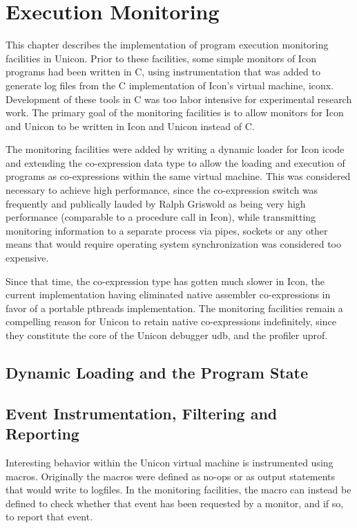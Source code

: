 \chapter{Execution Monitoring}

This chapter describes the implementation of program execution
monitoring facilities in Unicon. Prior to these facilities, some
simple monitors of Icon programs had been written in C, using
instrumentation that was added to generate log files from the C
implementation of Icon's virtual machine, iconx. Development of these
tools in C was too labor intensive for experimental research work. The
primary goal of the monitoring facilities is to allow monitors for
Icon and Unicon to be written in Icon and Unicon instead of C.

The monitoring facilities were added by writing a dynamic loader for
Icon icode and extending the co-expression data type to allow the
loading and execution of programs as co-expressions within the same
virtual machine. This was considered necessary to achieve high
performance, since the co-expression switch was frequently and
publically lauded by Ralph Griswold as being very high performance
(comparable to a procedure call in Icon), while transmitting
monitoring information to a separate process via pipes, sockets or
any other means that would require operating system synchronization
was considered too expensive.

Since that time, the co-expression type has gotten much slower in
Icon, the current implementation having eliminated native assembler
co-expressions in favor of a portable pthreads implementation. The
monitoring facilities remain a compelling reason for Unicon to retain
native co-expressions indefinitely, since they constitute the core
of the Unicon debugger udb, and the profiler uprof.

\section{Dynamic Loading and the Program State}

\section{Event Instrumentation, Filtering and Reporting}

Interesting behavior within the Unicon virtual machine is instrumented
using macros. Originally the macros were defined as no-ops or as
output statements that would write to logfiles. In the monitoring
facilities, the macro can instead be defined to check whether that
event has been requested by a monitor, and if so, to report that
event.

